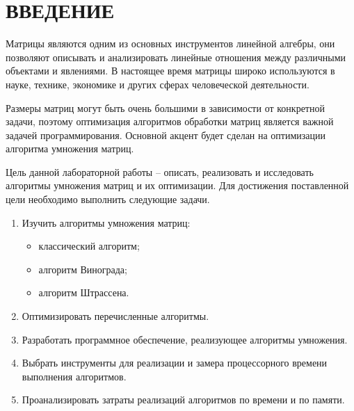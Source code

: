 \chapter*{ВВЕДЕНИЕ}

Матрицы являются одним из основных инструментов линейной алгебры, они позволяют описывать и анализировать линейные отношения между различными объектами и явлениями. В настоящее время матрицы широко используются в науке, технике, экономике и других сферах человеческой деятельности.

Размеры матриц могут быть очень большими в зависимости от конкретной задачи, поэтому оптимизация алгоритмов обработки матриц является важной задачей программирования. Основной акцент будет сделан на оптимизации алгоритма умножения матриц.

Цель данной лабораторной работы -- описать, реализовать и исследовать алгоритмы умножения матриц и их оптимизации.
Для достижения поставленной цели необходимо выполнить следующие задачи.
\begin{enumerate}
	\item Изучить алгоритмы умножения матриц: 
	\begin{itemize}
		\item классический алгоритм;
		\item алгоритм Винограда;
		\item алгоритм Штрассена.
	\end{itemize}
	\item Оптимизировать перечисленные алгоритмы.
	\item Разработать программное обеспечение, реализующее алгоритмы умножения.
	\item Выбрать инструменты для реализации и замера процессорного времени
	выполнения алгоритмов.
	\item Проанализировать затраты реализаций алгоритмов по времени и по памяти.
\end{enumerate}
